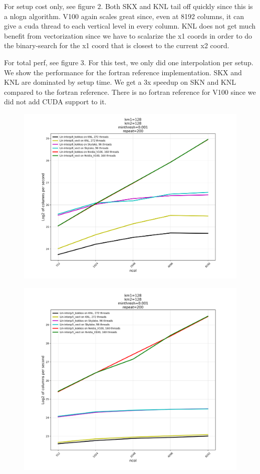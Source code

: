 \documentclass[10pt,twocolumn]{article}
\begin{document}
For setup cost only, see figure 2. Both SKX and KNL tail off quickly since this is a nlogn algorithm. V100
again scales great since, even at 8192 columns, it can give a cuda thread to each vertical level in every
column. KNL does not get much benefit from vectorization since we have to scalarize the x1 coords in order
to do the binary-search for the x1 coord that is closest to the current x2 coord.

For total perf, see figure 3. For this test, we only did one interpolation per setup. We show
the performance for the fortran reference implementation. SKX and KNL are dominated by setup
time. We get a 3x speedup on SKN and KNL compared to the fortran reference. There is no fortran
reference for V100 since we did not add CUDA support to it.

\onecolumn

\begin{figure}[hbt]
  \centering
  \includegraphics[width=1.0\linewidth]{final-li.pdf}
\end{figure}

\begin{figure}[hbt]
  \centering
  \includegraphics[width=1.0\linewidth]{final-setup.pdf}
\end{figure}
\end{document}
